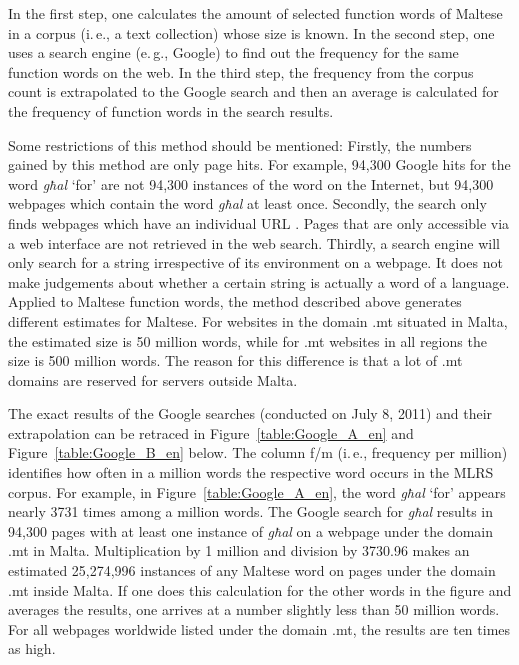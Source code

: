 \begin{multicols}{2}

In the first step, one calculates the amount of selected function words of Maltese in a corpus (i.\,e., a text collection) whose size is known. In the second step, one uses a search engine (e.\,g., Google) to find out the frequency for the same function words on the web. In the third step, the frequency from the corpus count is extrapolated to the Google search and then an average is calculated for the frequency of function words in the search results.

Some restrictions of this method should be mentioned: Firstly, the numbers gained by this method are only page hits. For example, 94,300 Google hits for the word \emph{għal} `for’ are not 94,300 instances of the word on the Internet, but 94,300 webpages which contain the word \emph{għal} at least once. Secondly, the search only finds webpages which have an individual URL \cite{Kilgarriff-Grefenstette:2003}. Pages that are only accessible via a web interface are not retrieved in the web search. Thirdly, a search engine will only search for a string irrespective of its environment on a webpage. It does not make judgements about whether a certain string is actually a word of a language. 
Applied to Maltese function words, the method described above generates different estimates for Maltese. For websites in the domain .mt situated in Malta, the estimated size is 50 million words, while for .mt websites in all regions the size is 500 million words. The reason for this difference is that a lot of .mt domains are reserved for servers outside Malta.

The exact results of the Google searches (conducted on July 8, 2011) and their extrapolation can be retraced in Figure~\ref{table:Google_A_en} and Figure~\ref{table:Google_B_en} below. The column f/m (i.\,e., frequency per million) identifies how often in a million words the respective word occurs in the MLRS corpus. For example, in Figure~\ref{table:Google_A_en}, the word \emph{għal} `for’ appears nearly 3731 times among a million words. The Google search for \emph{għal} results in 94,300 pages with at least one instance of \emph{għal} on a webpage under the domain .mt in Malta. Multiplication by 1 million and division by 3730.96 makes an estimated 25,274,996 instances of any Maltese word on pages under the domain .mt inside Malta. If one does this calculation for the other words in the figure and averages the results, one arrives at a number slightly less than 50 million words. For all webpages worldwide listed under the domain .mt, the results are ten times as high.


\end{multicols}
